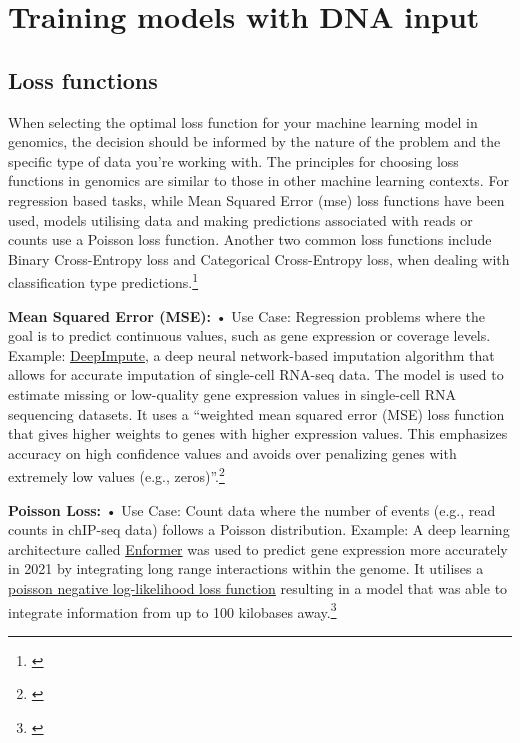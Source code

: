 \documentclass[
]{book}
\begin{document}
\part{Training models with DNA input}\label{part-training-models-with-dna-input}

\chapter{Loss functions}\label{loss-functions}

When selecting the optimal loss function for your machine learning model in genomics, the decision should be informed by the nature of the problem and the specific type of data you're working with. The principles for choosing loss functions in genomics are similar to those in other machine learning contexts. For regression based tasks, while Mean Squared Error (mse) loss functions have been used, models utilising data and making predictions associated with reads or counts use a Poisson loss function. Another two common loss functions include Binary Cross-Entropy loss and Categorical Cross-Entropy loss, when dealing with classification type predictions.\footnote{\citet{patterson2017}}

\textbf{Mean Squared Error (MSE):}
• Use Case: Regression problems where the goal is to predict continuous values, such as gene expression or coverage levels.
Example: \href{https://genomebiology.biomedcentral.com/articles/10.1186/s13059-019-1837-6}{DeepImpute}, a deep neural network-based imputation algorithm that allows for accurate imputation of single-cell RNA-seq data. The model is used to estimate missing or low-quality gene expression values in single-cell RNA sequencing datasets. It uses a ``weighted mean squared error (MSE) loss function that gives higher weights to genes with higher expression values. This emphasizes accuracy on high confidence values and avoids over penalizing genes with extremely low values (e.g., zeros)''.\footnote{\citet{cedric2019}}

\textbf{Poisson Loss:}
• Use Case: Count data where the number of events (e.g., read counts in chIP-seq data) follows a Poisson distribution.
Example: A deep learning architecture called \href{https://www.nature.com/articles/s41592-021-01252-x}{Enformer} was used to predict gene expression more accurately in 2021 by integrating long range interactions within the genome. It utilises a \href{https://pytorch.org/docs/stable/generated/torch.nn.PoissonNLLLoss.html}{poisson negative log-likelihood loss function} resulting in a model that was able to integrate information from up to 100 kilobases away.\footnote{\citet{avsec2021}}
\end{document}

